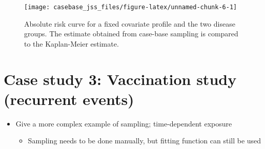 \documentclass[article]{jss}
\providecommand{\tightlist}{%
  \setlength{\itemsep}{0pt}\setlength{\parskip}{0pt}}
\begin{document}
\begin{CodeChunk}
\begin{figure}

{\centering \texttt{[image: casebase\_jss\_files/figure-latex/unnamed-chunk-6-1]} 

}

\caption{\label{fig:compAbsrisk}Absolute risk curve for a fixed covariate profile and the two disease groups. The estimate obtained from case-base sampling is compared to the Kaplan-Meier estimate.}\label{fig:unnamed-chunk-6}
\end{figure}
\end{CodeChunk}

\section{Case study 3: Vaccination study (recurrent
events)}\label{case-study-3-vaccination-study-recurrent-events}

\begin{itemize}
\tightlist
\item
  Give a more complex example of sampling; time-dependent exposure

  \begin{itemize}
  \tightlist
  \item
    Sampling needs to be done manually, but fitting function can still
    be used
  \end{itemize}
\end{itemize}

\renewcommand\refname{Discussion}

\end{document}
